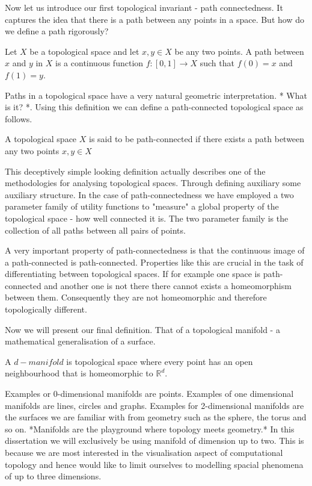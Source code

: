 
Now let us introduce our first topological invariant - path connectedness. It captures the idea that there is a path between any points in a space. But how do we define a path rigorously?

\begin{defn} Let $X$ be a topological space and let $x, y \in X$ be any two points. A path between $x$ and $y$ in $X$ is a continuous function $f: [0, 1] \to X$ such that $f(0) = x$ and $f(1) = y$.  \end{defn}


Paths in a topological space have a very natural geometric interpretation. * What is it? *. Using this definition we can define a path-connected topological space as follows.

\begin{defn} A topological space $X$ is said to be path-connected if there exists a path between any two points $x, y \in X$  \end{defn}

This deceptively simple looking definition actually describes one of the methodologies for analysing topological spaces. Through defining auxiliary some auxiliary structure. In the case of path-connectedness we have employed a two parameter family of utility functions to "measure" a global property of the topological space - how well connected it is. The two parameter family is the collection of all paths between all pairs of points.

A very important property of path-connectedness is that the continuous image of a path-connected is path-connected. Properties like this are crucial in the task of differentiating between topological spaces. If for example one space is path-connected and another one is not there there cannot exists a homeomorphism between them. Consequently they are not homeomorphic and therefore topologically different.

Now we will present our final definition. That of a topological manifold - a mathematical generalisation of a surface.

\begin{defn} A $d-manifold$ is topological space where every point has an open neighbourhood that is homeomorphic to $\mathbb{R}^d$.  \end{defn}

Examples or 0-dimensional manifolds are points. Examples of one dimensional manifolds are lines, circles and graphs. Examples for 2-dimensional manifolds are the surfaces we are familiar with from geometry such as the sphere, the torus and so on. *Manifolds are the playground where topology meets geometry.* In this dissertation we will exclusively be using manifold of dimension up to two. This is because we are most interested in the visualisation aspect of computational topology and hence would like to limit ourselves to modelling spacial phenomena of up to three dimensions.

